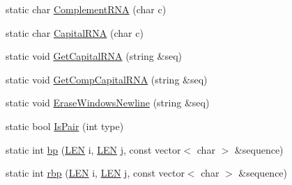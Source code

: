 \begin{DoxyCompactItemize}
\item 
static char \hyperlink{namespace_rfold_1_1_parameter_a8042581cc300f83be2272d1ad1edd8d0}{Complement\+R\+N\+A} (char c)
\item 
static char \hyperlink{namespace_rfold_1_1_parameter_a9ecf67fadc41759309b73ccc9c3d7009}{Capital\+R\+N\+A} (char c)
\item 
static void \hyperlink{namespace_rfold_1_1_parameter_adc3e395c2db7c0097c3790922e221f18}{Get\+Capital\+R\+N\+A} (string \&seq)
\item 
static void \hyperlink{namespace_rfold_1_1_parameter_a064f7e3feb0336cd945b2679563f27a9}{Get\+Comp\+Capital\+R\+N\+A} (string \&seq)
\item 
static void \hyperlink{namespace_rfold_1_1_parameter_ae260f7c90b29ae24ffbc4589c9fc0c76}{Erase\+Windows\+Newline} (string \&seq)
\item 
static bool \hyperlink{namespace_rfold_1_1_parameter_ac79332af130ad1da3bb3bbd6008bca00}{Is\+Pair} (int type)
\item 
static int \hyperlink{namespace_rfold_1_1_parameter_a84c9aba4d96ad6776c066fdc8a05497f}{bp} (\hyperlink{energy__const_8hh_a05b49c662c073f89e86804f7856622a0}{L\+E\+N} i, \hyperlink{energy__const_8hh_a05b49c662c073f89e86804f7856622a0}{L\+E\+N} j, const vector$<$ char $>$ \&sequence)
\item 
static int \hyperlink{namespace_rfold_1_1_parameter_aec0b5515ac41c13814b1af83a843b408}{rbp} (\hyperlink{energy__const_8hh_a05b49c662c073f89e86804f7856622a0}{L\+E\+N} i, \hyperlink{energy__const_8hh_a05b49c662c073f89e86804f7856622a0}{L\+E\+N} j, const vector$<$ char $>$ \&sequence)
\end{DoxyCompactItemize}
